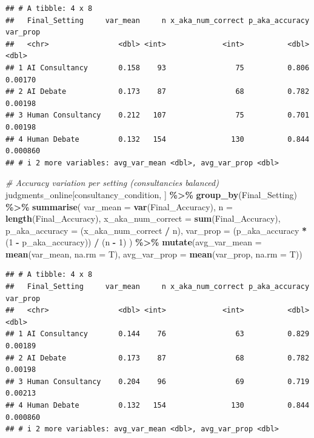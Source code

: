 \documentclass[
]{article}
\newenvironment{Shaded}{\begin{snugshade}}{\end{snugshade}}
\newcommand{\AttributeTok}[1]{\textcolor[rgb]{0.13,0.29,0.53}{#1}}
\newcommand{\CommentTok}[1]{\textcolor[rgb]{0.56,0.35,0.01}{\textit{#1}}}
\newcommand{\DecValTok}[1]{\textcolor[rgb]{0.00,0.00,0.81}{#1}}
\newcommand{\FunctionTok}[1]{\textcolor[rgb]{0.13,0.29,0.53}{\textbf{#1}}}
\newcommand{\NormalTok}[1]{#1}
\newcommand{\SpecialCharTok}[1]{\textcolor[rgb]{0.81,0.36,0.00}{\textbf{#1}}}
\begin{document}
\begin{verbatim}
## # A tibble: 4 x 8
##   Final_Setting     var_mean     n x_aka_num_correct p_aka_accuracy var_prop
##   <chr>                <dbl> <int>             <int>          <dbl>    <dbl>
## 1 AI Consultancy       0.158    93                75          0.806 0.00170 
## 2 AI Debate            0.173    87                68          0.782 0.00198 
## 3 Human Consultancy    0.212   107                75          0.701 0.00198 
## 4 Human Debate         0.132   154               130          0.844 0.000860
## # i 2 more variables: avg_var_mean <dbl>, avg_var_prop <dbl>
\end{verbatim}

\begin{Shaded}
\begin{Highlighting}[]
\CommentTok{\# Accuracy variation per setting (consultancies balanced)}
\NormalTok{judgments\_online[consultancy\_condition, ] }\SpecialCharTok{\%\textgreater{}\%}
  \FunctionTok{group\_by}\NormalTok{(Final\_Setting) }\SpecialCharTok{\%\textgreater{}\%}
  \FunctionTok{summarise}\NormalTok{(}
    \AttributeTok{var\_mean =} \FunctionTok{var}\NormalTok{(Final\_Accuracy),}
    \AttributeTok{n =} \FunctionTok{length}\NormalTok{(Final\_Accuracy),}
    \AttributeTok{x\_aka\_num\_correct =} \FunctionTok{sum}\NormalTok{(Final\_Accuracy),}
    \AttributeTok{p\_aka\_accuracy =}\NormalTok{ (x\_aka\_num\_correct }\SpecialCharTok{/}\NormalTok{ n),}
    \AttributeTok{var\_prop =}\NormalTok{ (p\_aka\_accuracy }\SpecialCharTok{*}\NormalTok{ (}\DecValTok{1} \SpecialCharTok{{-}}\NormalTok{ p\_aka\_accuracy)) }\SpecialCharTok{/}\NormalTok{ (n }\SpecialCharTok{{-}} \DecValTok{1}\NormalTok{)}
\NormalTok{  ) }\SpecialCharTok{\%\textgreater{}\%} \FunctionTok{mutate}\NormalTok{(}\AttributeTok{avg\_var\_mean =} \FunctionTok{mean}\NormalTok{(var\_mean, }\AttributeTok{na.rm =}\NormalTok{ T),}
               \AttributeTok{avg\_var\_prop =} \FunctionTok{mean}\NormalTok{(var\_prop, }\AttributeTok{na.rm =}\NormalTok{ T))}
\end{Highlighting}
\end{Shaded}

\begin{verbatim}
## # A tibble: 4 x 8
##   Final_Setting     var_mean     n x_aka_num_correct p_aka_accuracy var_prop
##   <chr>                <dbl> <int>             <int>          <dbl>    <dbl>
## 1 AI Consultancy       0.144    76                63          0.829 0.00189 
## 2 AI Debate            0.173    87                68          0.782 0.00198 
## 3 Human Consultancy    0.204    96                69          0.719 0.00213 
## 4 Human Debate         0.132   154               130          0.844 0.000860
## # i 2 more variables: avg_var_mean <dbl>, avg_var_prop <dbl>
\end{verbatim}
\end{document}
